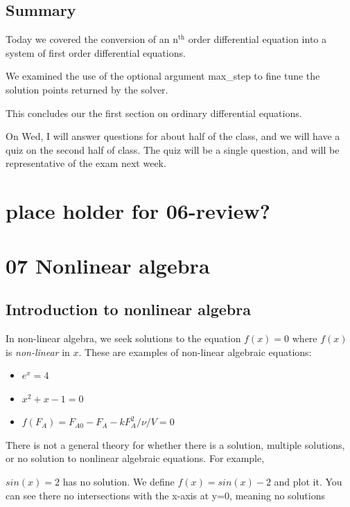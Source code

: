 \documentclass[11pt]{article}
\begin{document}
\subsection{Summary}
\label{sec:orgdcd227e}

Today we covered the conversion of an n\(^{\text{th}}\) order differential equation into a system of first order differential equations.

We examined the use of the optional argument max\_step to fine tune the solution points returned by the solver.

This concludes our the first section on ordinary differential equations.

On Wed, I will answer questions for about half of the class, and we will have a quiz on the second half of class. The quiz will be a single question, and will be representative of the exam next week.

\section{place holder for 06-review?}
\label{sec:org2561016}

\section{07 Nonlinear algebra}
\label{sec:org6852a6e}

\subsection{Introduction to nonlinear algebra}
\label{sec:org0570097}

In non-linear algebra, we seek solutions to the equation \(f(x) = 0\) where \(f(x)\) is \emph{non-linear} in \(x\). These are examples of non-linear algebraic equations:

\begin{itemize}
\item \(e^x=4\)
\item \(x^2 + x - 1 = 0\)
\item \(f(F_A) = F_{A0} - F_{A} - k F_A^2 / \nu / V = 0\)
\end{itemize}

There is not a general theory for whether there is a solution, multiple solutions, or no solution to nonlinear algebraic equations. For example,

\(sin(x) = 2\) has no solution. We define \(f(x) = sin(x) - 2\) and plot it. You can see there no intersections with the x-axis at y=0, meaning no solutions
\end{document}
